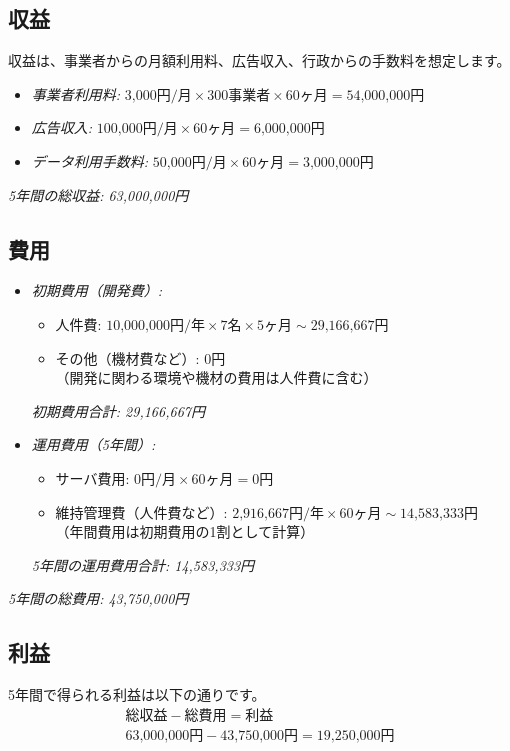 \documentclass{docs}
\begin{document}
\subsection{収益}
収益は、事業者からの月額利用料、広告収入、行政からの手数料を想定します。
\begin{itemize}
	\item \emph{事業者利用料:} $\text{3,000円/月}\times\text{300事業者}
	\times\text{60ヶ月}=\text{54,000,000円}$
	\item \emph{広告収入:} $\text{100,000円/月}\times\text{60ヶ月}
	=\text{6,000,000円}$
	\item \emph{データ利用手数料:} $\text{50,000円/月}\times\text{60ヶ月}
	=\text{3,000,000円}$
\end{itemize}
\emph{5年間の総収益: 63,000,000円}

\subsection{費用}
\begin{itemize}
	\item \emph{初期費用（開発費）:}
		\begin{itemize}
			\item 人件費: $\text{10,000,000円/年}\times\text{7名}\times\text{5ヶ月}
			\sim\text{29,166,667円}$
			\item その他（機材費など）: 0円\\
			（開発に関わる環境や機材の費用は人件費に含む）
		\end{itemize}
		\emph{初期費用合計: 29,166,667円}
	\item \emph{運用費用（5年間）:}
		\begin{itemize}
			\item サーバ費用: $\text{0円/月}\times\text{60ヶ月}
			=\text{0円}$
			\item 維持管理費（人件費など）: $\text{2,916,667円/年}\times\text{60ヶ月}
			\sim\text{14,583,333円}$\\
			（年間費用は初期費用の1割として計算）
		\end{itemize}
		\emph{5年間の運用費用合計: 14,583,333円}
\end{itemize}
\emph{5年間の総費用: 43,750,000円}

\subsection{利益}
5年間で得られる利益は以下の通りです。
\begin{gather*}
	\text{総収益} - \text{総費用} = \text{利益}\\
	\text{63,000,000円} - \text{43,750,000円} = \text{19,250,000円}
\end{gather*}
\end{document}
